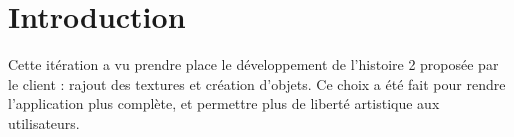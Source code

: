 \section{Introduction}

Cette itération a vu prendre place le développement de l'histoire 2 proposée
par le client : rajout des textures et création d'objets. Ce choix a été fait
pour rendre l'application plus complète, et permettre plus de liberté artistique
aux utilisateurs. 